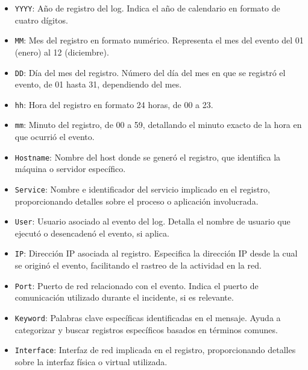 \begin{itemize}
    \item \texttt{YYYY}: Año de registro del log. Indica el año de calendario en formato de cuatro dígitos. \\
    \item \texttt{MM}: Mes del registro en formato numérico. Representa el mes del evento del 01 (enero) al 12 (diciembre). \\
    \item \texttt{DD}: Día del mes del registro. Número del día del mes en que se registró el evento, de 01 hasta 31, dependiendo del mes. \\
    \item \texttt{hh}: Hora del registro en formato 24 horas, de 00 a 23. \\
    \item \texttt{mm}: Minuto del registro, de 00 a 59, detallando el minuto exacto de la hora en que ocurrió el evento. \\
    \item \texttt{Hostname}: Nombre del host donde se generó el registro, que identifica la máquina o servidor específico. \\
    \item \texttt{Service}: Nombre e identificador del servicio implicado en el registro, proporcionando detalles sobre el proceso o aplicación involucrada. \\
    \item \texttt{User}: Usuario asociado al evento del log. Detalla el nombre de usuario que ejecutó o desencadenó el evento, si aplica. \\
    \item \texttt{IP}: Dirección \gls{IP} asociada al registro. Especifica la dirección IP desde la cual se originó el evento, facilitando el rastreo de la actividad en la red. \\
    \item \texttt{Port}: Puerto de red relacionado con el evento. Indica el puerto de comunicación utilizado durante el incidente, si es relevante. \\
    \item \texttt{Keyword}: Palabras clave específicas identificadas en el mensaje. Ayuda a categorizar y buscar registros específicos basados en términos comunes. \\
    \item \texttt{Interface}: Interfaz de red implicada en el registro, proporcionando detalles sobre la interfaz física o virtual utilizada. \\

\end{itemize}
